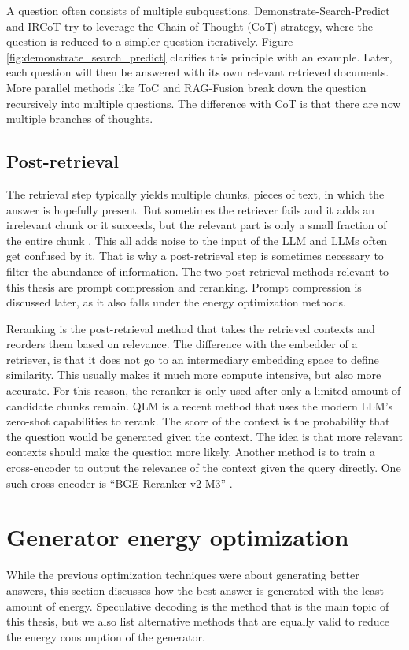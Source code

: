 A question often consists of multiple subquestions. Demonstrate-Search-Predict \cite{khattab2022demonstrate} and IRCoT \cite{trivedi2022interleaving} try to leverage the 
Chain of Thought (CoT) strategy, where the question is reduced to a simpler question iteratively. Figure \ref{fig:demonstrate_search_predict} clarifies this principle with an example. Later, each question will then be answered with its own relevant retrieved documents. More parallel methods like ToC \cite{kim2023tree} and RAG-Fusion \cite{rackauckas2024ragfusion} break down the question recursively into multiple questions. The difference with CoT is that there are now multiple branches of thoughts.

\subsection{Post-retrieval}
The retrieval step typically yields multiple chunks, pieces of text, in which the answer is hopefully present. But sometimes the retriever fails and it adds an irrelevant chunk or it succeeds, but the relevant part is only a small fraction of the entire chunk \cite{fan2024survey}. This all adds noise to the input of the LLM and LLMs often get confused by it. That is why a post-retrieval step is sometimes necessary to filter the abundance of information. The two post-retrieval methods relevant to this thesis are prompt compression and reranking. Prompt compression is discussed later, as it also falls under the energy optimization methods.

Reranking is the post-retrieval method that takes the retrieved contexts and reorders them based on relevance. The difference with the embedder of a retriever, is that it does not go to an intermediary embedding space to define similarity. This usually makes it much more compute intensive, but also more accurate. For this reason, the reranker is only used after only a limited amount of candidate chunks remain. QLM \cite{zhuang2023qlm} is a recent method that uses the modern LLM's zero-shot capabilities to rerank. The score of the context is the probability that the question would be generated given the context. The idea is that more relevant contexts should make the question more likely. Another method is to train a cross-encoder to output the relevance of the context given the query directly. One such cross-encoder is ``BGE-Reranker-v2-M3'' \cite{chen2024bge}.

\section{Generator energy optimization}
While the previous optimization techniques were about generating better answers, this section discusses how the best answer is generated with the least amount of energy. Speculative decoding is the method that is the main topic of this thesis, but we also list alternative methods that are equally valid to reduce the energy consumption of the generator.

